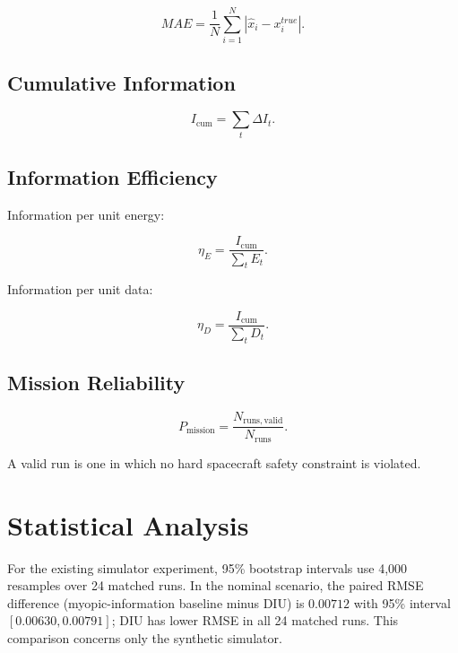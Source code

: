 \documentclass[11pt,a4paper]{article}
\begin{document}
\begin{equation}
MAE
=
\frac{1}{N}
\sum_{i=1}^{N}
|\hat x_i-x_i^{true}|.
\end{equation}

\subsection{Cumulative Information}

\begin{equation}
I_{\mathrm{cum}}
=
\sum_t
\Delta I_t.
\end{equation}

\subsection{Information Efficiency}

Information per unit energy:

\begin{equation}
\eta_E
=
\frac{
I_{\mathrm{cum}}
}{
\sum_tE_t
}.
\end{equation}

Information per unit data:

\begin{equation}
\eta_D
=
\frac{
I_{\mathrm{cum}}
}{
\sum_tD_t
}.
\end{equation}

\subsection{Mission Reliability}

\begin{equation}
P_{\mathrm{mission}}
=
\frac{
N_{\mathrm{runs,valid}}
}{
N_{\mathrm{runs}}
}.
\end{equation}

A valid run is one in which no hard spacecraft safety constraint is
violated.


\section{Statistical Analysis}

For the existing simulator experiment, 95\% bootstrap intervals use
4,000 resamples over 24 matched runs. In the nominal scenario, the paired
RMSE difference (myopic-information baseline minus DIU) is
$0.00712$ with 95\% interval $[0.00630,0.00791]$; DIU has lower RMSE
in all 24 matched runs. This comparison concerns only the synthetic
simulator.
\end{document}
